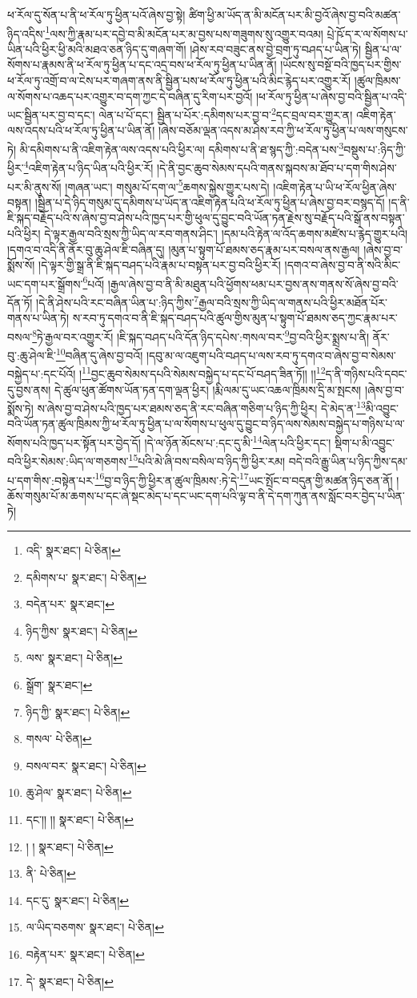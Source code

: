 ཕ་རོལ་དུ་སོན་པ་ནི་ཕ་རོལ་ཏུ་ཕྱིན་པའོ་ཞེས་བྱ་སྟེ། ཚིག་ཕྱི་མ་ཡོད་ན་མི་མངོན་པར་མི་བྱའོ་ཞེས་བྱ་བའི་མཚན་ཉིད་འདིས་\footnote{འདི་  སྣར་ཐང་།  པེ་ཅིན། }ལས་ཀྱི་རྣམ་པར་དབྱེ་བ་མི་མངོན་པར་མ་བྱས་པས་གཟུགས་སུ་འགྱུར་བའམ། པྲེ་ཥོ་ད་ར་ལ་སོགས་པ་ཡིན་པའི་ཕྱིར་ཕྱི་མའི་མཐའ་ཅན་ཉིད་དུ་གཞག་གོ། །ཤེས་རབ་བཟུང་ནས་བྱེ་བྲག་ཏུ་བཤད་པ་ཡིན་ཏེ། སྦྱིན་པ་ལ་སོགས་པ་རྣམས་ནི་ཕ་རོལ་ཏུ་ཕྱིན་པ་དང་འདྲ་བས་ཕ་རོལ་ཏུ་ཕྱིན་པ་ཡིན་ནོ། །ཡོངས་སུ་བསྔོ་བའི་ཁྱད་པར་གྱིས་ཕ་རོལ་ཏུ་འགྲོ་བ་ལ་ངེས་པར་གཞག་ནས་ནི་སྦྱིན་པས་ཕ་རོལ་ཏུ་ཕྱིན་པའི་མིང་རྙེད་པར་འགྱུར་རོ། །ཚུལ་ཁྲིམས་ལ་སོགས་པ་འཆད་པར་འགྱུར་བ་དག་ཀྱང་དེ་བཞིན་དུ་རིག་པར་བྱའོ། །ཕ་རོལ་ཏུ་ཕྱིན་པ་ཞེས་བྱ་བའི་སྦྱིན་པ་འདི་ཡང་སྦྱིན་པར་བྱ་བ་དང་། ལེན་པ་པོ་དང་། སྦྱིན་པ་པོར་:དམིགས་པར་བྱ་བ་\footnote{དམིགས་པ་  སྣར་ཐང་།  པེ་ཅིན། }དང་བྲལ་བར་གྱུར་ན། འཇིག་རྟེན་ལས་འདས་པའི་ཕ་རོལ་ཏུ་ཕྱིན་པ་ཡིན་ནོ། །ཞེས་བཅོམ་ལྡན་འདས་མ་ཤེས་རབ་ཀྱི་ཕ་རོལ་ཏུ་ཕྱིན་པ་ལས་གསུངས་ཏེ། མི་དམིགས་པ་ནི་འཇིག་རྟེན་ལས་འདས་པའི་ཕྱིར་ལ། དམིགས་པ་ནི་ཐ་སྙད་ཀྱི་:བདེན་པས་\footnote{བདེན་པར་  སྣར་ཐང་། }བསྡུས་པ་:ཉིད་ཀྱི་ཕྱིར་\footnote{ཉིད་ཀྱིས་  སྣར་ཐང་།  པེ་ཅིན། }འཇིག་རྟེན་པ་ཉིད་ཡིན་པའི་ཕྱིར་རོ། །དེ་ནི་བྱང་ཆུབ་སེམས་དཔའི་གནས་སྐབས་མ་ཐོབ་པ་དག་གིས་ཤེས་པར་མི་ནུས་སོ། །གཞན་ཡང་། གསུམ་པོ་དག་ལ་\footnote{ལས་  སྣར་ཐང་།  པེ་ཅིན། }ཆགས་སྐྱེས་གྱུར་པས་དེ། །འཇིག་རྟེན་པ་ཡི་ཕ་རོལ་ཕྱིན་ཞེས་བསྟན། །སྦྱིན་པ་དེ་ཉིད་གསུམ་དུ་དམིགས་པ་ཡོད་ན་འཇིག་རྟེན་པའི་ཕ་རོལ་ཏུ་ཕྱིན་པ་ཞེས་བྱ་བར་བསྙད་དོ། །ད་ནི་ཇི་སྐད་བརྗོད་པའི་ས་ཞེས་བྱ་བ་ཤེས་པའི་ཁྱད་པར་གྱི་ཕུལ་དུ་བྱུང་བའི་ཡོན་ཏན་རྗེས་སུ་བརྗོད་པའི་སྒོ་ནས་བསྟན་པའི་ཕྱིར། དེ་ལྟར་རྒྱལ་བའི་སྲས་ཀྱི་ཡིད་ལ་རབ་གནས་ཤིང་། །དམ་པའི་རྟེན་ལ་འོད་ཆགས་མཛེས་པ་རྙེད་གྱུར་པའི། །དགའ་བ་འདི་ནི་ནོར་བུ་ཆུ་ཤེལ་ཇི་བཞིན་དུ། །མུན་པ་སྟུག་པོ་ཐམས་ཅད་རྣམ་པར་བསལ་ནས་རྒྱལ། །ཞེས་བྱ་བ་སྨོས་སོ། །དེ་ལྟར་གྱི་སྒྲ་ནི་ཇི་སྐད་བཤད་པའི་རྣམ་པ་བསྟན་པར་བྱ་བའི་ཕྱིར་རོ། །དགའ་བ་ཞེས་བྱ་བ་ནི་སའི་མིང་ཡང་དག་པར་སྒྲོགས་\footnote{སྒྲོག་  སྣར་ཐང་། }པའོ། །རྒྱལ་ཞེས་བྱ་བ་ནི་མི་མཐུན་པའི་ཕྱོགས་ཕམ་པར་བྱས་ནས་གནས་སོ་ཞེས་བྱ་བའི་དོན་ཏོ། །དེ་ནི་ཤེས་པའི་རང་བཞིན་ཡིན་པ་:ཉིད་ཀྱིས་\footnote{ཉིད་ཀྱི་  སྣར་ཐང་།  པེ་ཅིན། }རྒྱལ་བའི་སྲས་ཀྱི་ཡིད་ལ་གནས་པའི་ཕྱིར་མཐོན་པོར་གནས་པ་ཡིན་ཏེ། ས་རབ་ཏུ་དགའ་བ་ནི་ཇི་སྐད་བཤད་པའི་ཚུལ་གྱིས་མུན་པ་སྟུག་པོ་ཐམས་ཅད་ཀྱང་རྣམ་པར་བསལ་\footnote{གསལ་  པེ་ཅིན། }ཏེ་རྒྱལ་བར་འགྱུར་རོ། །ཇི་སྐད་བཤད་པའི་དོན་ཉིད་དཔེས་:གསལ་བར་\footnote{བསལ་བར་  སྣར་ཐང་།  པེ་ཅིན། }བྱ་བའི་ཕྱིར་སྨྲས་པ་ནི། ནོར་བུ་:ཆུ་ཤེལ་ཇི་\footnote{ཆུ་ཤེལ་  སྣར་ཐང་།  པེ་ཅིན། }བཞིན་དུ་ཞེས་བྱ་བའོ། །དབུ་མ་ལ་འཇུག་པའི་བཤད་པ་ལས་རབ་ཏུ་དགའ་བ་ཞེས་བྱ་བ་སེམས་བསྐྱེད་པ་:དང་པོའོ། །\footnote{དང་།། །།  སྣར་ཐང་།  པེ་ཅིན། }བྱང་ཆུབ་སེམས་དཔའི་སེམས་བསྐྱེད་པ་དང་པོ་བཤད་ཟིན་ཏོ།། །།\footnote{། །  སྣར་ཐང་།  པེ་ཅིན། }ད་ནི་གཉིས་པའི་དབང་དུ་བྱས་ནས། དེ་ཚུལ་ཕུན་ཚོགས་ཡོན་ཏན་དག་ལྡན་ཕྱིར། །རྨི་ལམ་དུ་ཡང་འཆལ་ཁྲིམས་དྲི་མ་སྤངས། །ཞེས་བྱ་བ་སྨོས་ཏེ། ས་ཞེས་བྱ་བ་ཤེས་པའི་ཁྱད་པར་ཐམས་ཅད་ནི་རང་བཞིན་གཅིག་པ་ཉིད་ཀྱི་ཕྱིར། དེ་མེད་ན་\footnote{ནི་  པེ་ཅིན། }མི་འབྱུང་བའི་ཡོན་ཏན་ཚུལ་ཁྲིམས་ཀྱི་ཕ་རོལ་ཏུ་ཕྱིན་པ་ལ་སོགས་པ་ཕུལ་དུ་བྱུང་བ་ཉིད་ལས་སེམས་བསྐྱེད་པ་གཉིས་པ་ལ་སོགས་པའི་ཁྱད་པར་སྟོན་པར་བྱེད་དོ། །དེ་ལ་ཉོན་མོངས་པ་:དང་དུ་མི་\footnote{དང་དུ་  སྣར་ཐང་།  པེ་ཅིན། }ལེན་པའི་ཕྱིར་དང་། སྡིག་པ་མི་འབྱུང་བའི་ཕྱིར་སེམས་:ཡིད་ལ་གཅགས་\footnote{ལ་ཡིད་བཅགས་  སྣར་ཐང་།  པེ་ཅིན། }པའི་མེ་ཞི་བས་བསིལ་བ་ཉིད་ཀྱི་ཕྱིར་རམ། བདེ་བའི་རྒྱུ་ཡིན་པ་ཉིད་ཀྱིས་དམ་པ་དག་གིས་:བསྟེན་པར་\footnote{བརྟེན་པར་  སྣར་ཐང་།  པེ་ཅིན། }བྱ་བ་ཉིད་ཀྱི་ཕྱིར་ན་ཚུལ་ཁྲིམས་:ཏེ་དེ་\footnote{དེ་  སྣར་ཐང་།  པེ་ཅིན། }ཡང་སྤོང་བ་བདུན་གྱི་མཚན་ཉིད་ཅན་ནོ། །ཆོས་གསུམ་པོ་མ་ཆགས་པ་དང་ཞེ་སྡང་མེད་པ་དང་ཡང་དག་པའི་ལྟ་བ་ནི་དེ་དག་ཀུན་ནས་སློང་བར་བྱེད་པ་ཡིན་ཏེ། 
